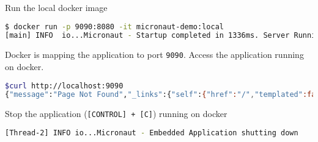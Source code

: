 \begin{enumerate}
Run the local docker image

\begin{lstlisting}[language=bash]
$ docker run -p 9090:8080 -it micronaut-demo:local
[main] INFO  io...Micronaut - Startup completed in 1336ms. Server Running: http://b09cb58fb87a:8080
\end{lstlisting}

Docker is mapping the application to port \texttt{9090}.  Access the application running on docker.

\begin{lstlisting}[language=bash]
$curl http://localhost:9090
{"message":"Page Not Found","_links":{"self":{"href":"/","templated":false}}}
\end{lstlisting}

Stop the application (\texttt{[CONTROL] + [C]}) running on docker

\begin{lstlisting}[language=bash]
[Thread-2] INFO io...Micronaut - Embedded Application shutting down
\end{lstlisting}


\end{enumerate}